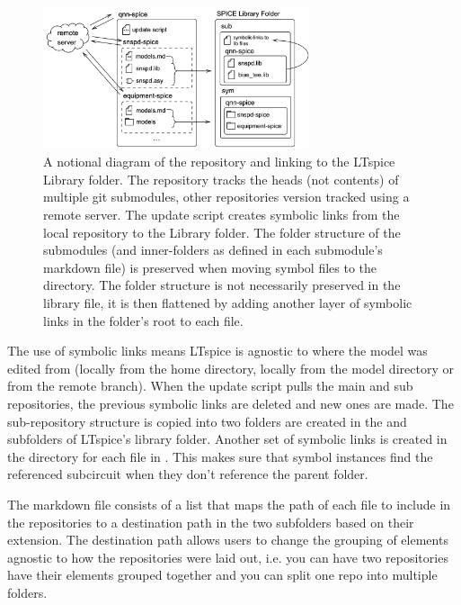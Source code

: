 \begin{figure}
    \centering
    \includegraphics[width=0.7\textwidth]{figs/qnn-spice-interaction.png}
    \caption{A notional diagram of the  repository and linking to the LTspice Library folder.
    The  repository tracks the heads (not contents) of multiple git submodules, other repositories version
    tracked using a remote server. The  update script creates symbolic links from the local
    repository to the Library folder. The folder structure of the submodules (and inner-folders as defined in each submodule's  markdown file) is preserved when moving symbol files to the  directory. The folder structure is not necessarily preserved in the library file, it is then flattened by adding another
    layer of symbolic links in the  folder's root to each  file.}
    \label{fig:qnn-spice-interaction}
\end{figure}

The use of symbolic links means LTspice is agnostic to where the model was edited from
(locally from the home directory, locally from the model directory or from the remote branch).
When the update script pulls the main and sub repositories, the previous symbolic links are deleted and new ones are 
made. The sub-repository structure is copied into two  folders are created in the  and  
subfolders of LTspice's library folder. Another set of symbolic links is created in the
 directory for each file in . This makes sure that symbol
instances find the referenced subcircuit when they don't reference the parent 
folder.

The markdown file consists of a list that maps the path of each file to include in the repositories to a destination path in the two
 subfolders based on their extension. 
The destination path allows users to change the grouping of elements agnostic to how the repositories
were laid out, i.e. you can have two repositories have their elements grouped together and you can split one
repo into multiple folders. 

